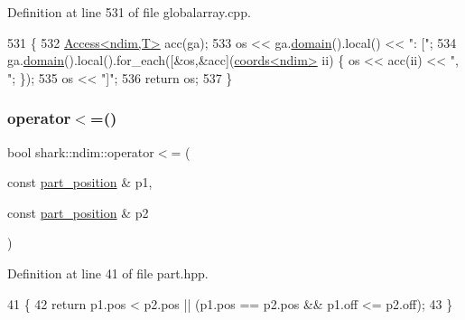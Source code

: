 Definition at line 531 of file globalarray.\+cpp.


\begin{DoxyCode}
531                                                                                \{
532     \hyperlink{classshark_1_1ndim_1_1_access}{Access<ndim,T>} acc(ga);
533     os << ga.\hyperlink{classshark_1_1ndim_1_1_global_array_a435ee8ff23c3feadf2ef2be64d4f375c}{domain}().local() << \textcolor{stringliteral}{": ["};
534     ga.\hyperlink{classshark_1_1ndim_1_1_global_array_a435ee8ff23c3feadf2ef2be64d4f375c}{domain}().local().for\_each([&os,&acc](\hyperlink{structshark_1_1ndim_1_1coords}{coords<ndim>} ii) \{ os << acc(ii) << \textcolor{stringliteral}{", "}; \});
535     os << \textcolor{stringliteral}{"]"};
536     \textcolor{keywordflow}{return} os;
537 \}
\end{DoxyCode}
\hypertarget{namespaceshark_1_1ndim_a11c1e2d2234f8635e565da16689caba9}{}\label{namespaceshark_1_1ndim_a11c1e2d2234f8635e565da16689caba9} 
\subsubsection{\texorpdfstring{operator$<$=()}{operator<=()}}
{\footnotesize\ttfamily bool shark\+::ndim\+::operator$<$= (\begin{DoxyParamCaption}\item[{const \hyperlink{structshark_1_1ndim_1_1part__position}{part\+\_\+position} \&}]{p1,  }\item[{const \hyperlink{structshark_1_1ndim_1_1part__position}{part\+\_\+position} \&}]{p2 }\end{DoxyParamCaption})\hspace{0.3cm}{\ttfamily [inline]}}



Definition at line 41 of file part.\+hpp.


\begin{DoxyCode}
41                                                                                  \{
42             \textcolor{keywordflow}{return} p1.pos < p2.pos || (p1.pos == p2.pos && p1.off <= p2.off);
43         \}
\end{DoxyCode}
\hypertarget{namespaceshark_1_1ndim_a1e0a8ad9243246f1ae0965ff1386b0db}{}\label{namespaceshark_1_1ndim_a1e0a8ad9243246f1ae0965ff1386b0db} 
